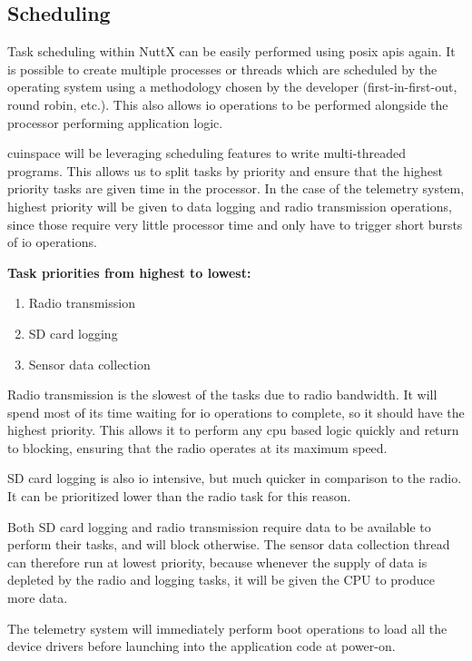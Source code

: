 \subsection{Scheduling}

Task scheduling within NuttX can be easily performed using \gls{posix} \glspl{api} again. It is possible to create
multiple processes or threads which are scheduled by the operating system using a methodology chosen by the developer
(first-in-first-out, round robin, etc.). This also allows \gls{io} operations to be performed alongside the processor
performing application logic.

\Gls{cuinspace} will be leveraging scheduling features to write multi-threaded programs. This allows us to split tasks
by priority and ensure that the highest priority tasks are given time in the processor. In the case of the telemetry
system, highest priority will be given to data logging and radio transmission operations, since those require very
little processor time and only have to trigger short bursts of \gls{io} operations.

\textbf{Task priorities from highest to lowest:}

\begin{enumerate}
    \item Radio transmission
    \item SD card logging
    \item Sensor data collection
\end{enumerate}

Radio transmission is the slowest of the tasks due to radio bandwidth. It will spend most of its time waiting for
\gls{io} operations to complete, so it should have the highest priority. This allows it to perform any \gls{cpu} based
logic quickly and return to blocking, ensuring that the radio operates at its maximum speed.

SD card logging is also \gls{io} intensive, but much quicker in comparison to the radio. It can be prioritized lower
than the radio task for this reason.

Both SD card logging and radio transmission require data to be available to perform their tasks, and will block
otherwise. The sensor data collection thread can therefore run at lowest priority, because whenever the supply of data
is depleted by the radio and logging tasks, it will be given the CPU to produce more data.

The telemetry system will immediately perform boot operations to load all the device drivers before launching into the
application code at power-on.

